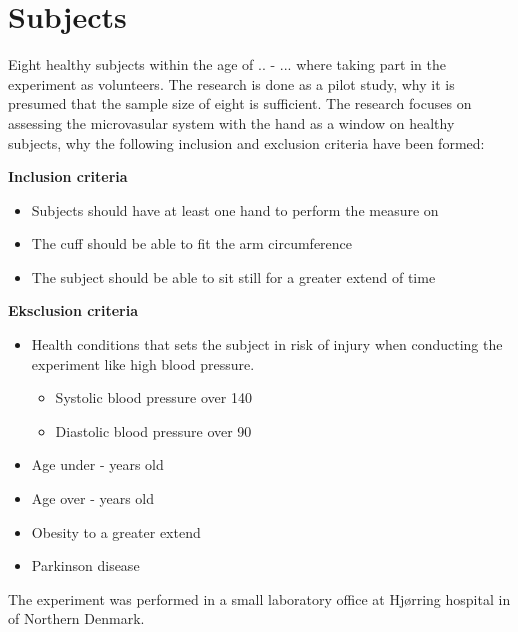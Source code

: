 \section{Subjects}

Eight healthy subjects within the age of .. - ... where taking part in the experiment as volunteers. The research is done as a pilot study, why it is presumed that the sample size of eight is sufficient. The research focuses on assessing the microvasular system with the hand as a window on healthy subjects, why the following inclusion and exclusion criteria have been formed:

\textbf{Inclusion criteria}
\begin{itemize}[noitemsep]
	\item Subjects should have at least one hand to perform the measure on
	\item The cuff should be able to fit the arm circumference 
	\item The subject should be able to sit still for a greater extend of time
\end{itemize}

\textbf{Eksclusion criteria}
\begin{itemize}[noitemsep]
	\item Health conditions that sets the subject in risk of injury when conducting the experiment like high blood pressure.
	\begin{itemize}
		\item Systolic blood pressure over 140
		\item Diastolic blood pressure over 90
	\end{itemize}	
	\item Age under - years old
	\item Age over - years old
	\item Obesity to a greater extend
	\item Parkinson disease  
\end{itemize} 

The experiment was performed in a small laboratory office at Hjørring hospital in of Northern Denmark. 